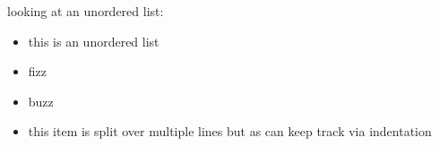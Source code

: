 

looking at an unordered list:

\begin{itemize}
    \item this is an unordered list

    \item fizz

    \item buzz

    \item this item is split over multiple lines
        but as can keep track via indentation

\end{itemize}